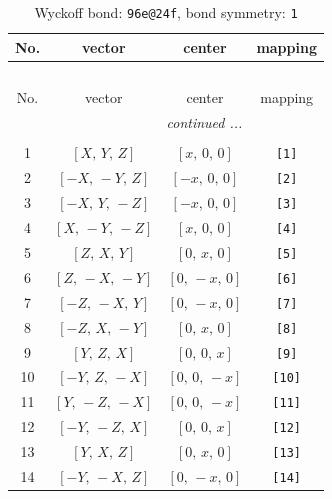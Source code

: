 \documentclass[fleqn,8pt]{jsarticle}
\begin{document}
\begin{longtable}{cccc}
\caption{Wyckoff bond: {\tt 96e@24f}, bond symmetry: {\tt 1}}
 \\
 \hline \hline
No. & vector & center & mapping \\ \hline \endfirsthead

\multicolumn{3}{l}{\tablename\ \thetable{}} \\
 \hline \hline
No. & vector & center & mapping \\ \hline \endhead

 \hline \hline
\multicolumn{3}{r}{\footnotesize\it continued ...} \\ \endfoot

 \hline \hline
\multicolumn{3}{r}{} \\ \endlastfoot

1 & $\left[ X,\, Y,\, Z \right]$ & $\left[ x,\, 0,\, 0 \right]$ & {\tt [1]} \\ \hline
2 & $\left[ - X,\, - Y,\, Z \right]$ & $\left[ - x,\, 0,\, 0 \right]$ & {\tt [2]} \\ \hline
3 & $\left[ - X,\, Y,\, - Z \right]$ & $\left[ - x,\, 0,\, 0 \right]$ & {\tt [3]} \\ \hline
4 & $\left[ X,\, - Y,\, - Z \right]$ & $\left[ x,\, 0,\, 0 \right]$ & {\tt [4]} \\ \hline
5 & $\left[ Z,\, X,\, Y \right]$ & $\left[ 0,\, x,\, 0 \right]$ & {\tt [5]} \\ \hline
6 & $\left[ Z,\, - X,\, - Y \right]$ & $\left[ 0,\, - x,\, 0 \right]$ & {\tt [6]} \\ \hline
7 & $\left[ - Z,\, - X,\, Y \right]$ & $\left[ 0,\, - x,\, 0 \right]$ & {\tt [7]} \\ \hline
8 & $\left[ - Z,\, X,\, - Y \right]$ & $\left[ 0,\, x,\, 0 \right]$ & {\tt [8]} \\ \hline
9 & $\left[ Y,\, Z,\, X \right]$ & $\left[ 0,\, 0,\, x \right]$ & {\tt [9]} \\ \hline
10 & $\left[ - Y,\, Z,\, - X \right]$ & $\left[ 0,\, 0,\, - x \right]$ & {\tt [10]} \\ \hline
11 & $\left[ Y,\, - Z,\, - X \right]$ & $\left[ 0,\, 0,\, - x \right]$ & {\tt [11]} \\ \hline
12 & $\left[ - Y,\, - Z,\, X \right]$ & $\left[ 0,\, 0,\, x \right]$ & {\tt [12]} \\ \hline
13 & $\left[ Y,\, X,\, Z \right]$ & $\left[ 0,\, x,\, 0 \right]$ & {\tt [13]} \\ \hline
14 & $\left[ - Y,\, - X,\, Z \right]$ & $\left[ 0,\, - x,\, 0 \right]$ & {\tt [14]} \\ \hline

\end{longtable}
\end{document}
